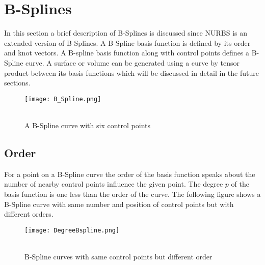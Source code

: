 \documentclass[11pt]{article}
\begin{document}
\section{B-Splines } \label{B_Spline}
In this section a brief description of B-Splines is discussed since NURBS is an
extended version of B-Splines. A B-Spline basis function is defined by its order
and knot vectors. A B-spline basis function along with control points defines a
B-Spline curve. A surface or volume can be generated using a curve by tensor product between its basis functions which will be discussed in detail in the future sections. 
\begin{figure}[H]
	\begin{center}
		\texttt{[image: B\_Spline.png]} 
		\caption{\\A B-Spline curve with six control points}\label{B_Spline}
	\end{center}	
\end{figure}
\subsection{Order }
For a point on a B-Spline curve the order of the basis function speaks about the
number of nearby control points influence the given point. The degree $p$ of the
basis function is one less than the order of the curve.
The following figure shows a B-Spline curve with same number and position of control points but with different orders.
\begin{figure}[H]
	\begin{center}
		\texttt{[image: DegreeBspline.png]} 
		\caption{\\B-Spline curves with same control points but different order}\label{DegreeBspline}
	\end{center}	
\end{figure}
\end{document}

